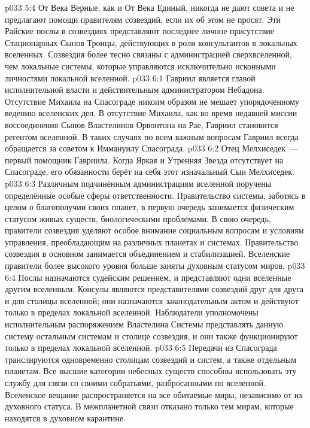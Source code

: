 \vs p033 5:4 От Века Верные, как и От Века Единый, никогда не дают совета и не предлагают помощи правителям созвездий, если их об этом не просят. Эти Райские послы в созвездиях представляют последнее личное присутствие Стационарных Сынов Троицы, действующих в роли консультантов в локальных вселенных. Созвездия более тесно связаны с администрацией сверхвселенной, чем локальные системы, которые управляются исключительно исконными личностями локальной вселенной.
\vs p033 6:1 Гавриил является главой исполнительной власти и действительным администратором Небадона. Отсутствие Михаила на Спасограде никоим образом не мешает упорядоченному ведению вселенских дел. В отсутствие Михаила, как во время недавней миссии воссоединения Сынов Властелинов Орвонтона на Рае, Гавриил становится регентом вселенной. В таких случаях по всем важным вопросам Гавриил всегда обращается за советом к Иммануилу Спасограда.
\vs p033 6:2 Отец Мелхиседек~--- первый помощник Гавриила. Когда Яркая и Утренняя Звезда отсутствует на Спасограде, его обязанности берёт на себя этот изначальный Сын Мелхиседек.
\vs p033 6:3 \pc Различным подчинённым администрациям вселенной поручены определённые особые сферы ответственности. Правительство системы, заботясь в целом о благополучии своих планет, в первую очередь занимается физическим статусом живых существ, биологическими проблемами. В свою очередь, правители созвездия уделяют особое внимание социальным вопросам и условиям управления, преобладающим на различных планетах и системах. Правительство созвездия в основном занимается объединением и стабилизацией. Вселенские правители более высокого уровня больше заняты духовным статусом миров.
\vs p033 6:4 \pc Послы назначаются судейским решением, и представляют одни вселенные другим вселенным. Консулы являются представителями созвездий друг для друга и для столицы вселенной; они назначаются законодательным актом и действуют только в пределах локальной вселенной. Наблюдатели уполномочены исполнительным распоряжением Властелина Системы представлять данную систему остальным системам и столице созвездия, и они также функционируют только в пределах локальной вселенной.
\vs p033 6:5 \pc Передачи из Спасограда транслируются одновременно столицам созвездий и систем, а также отдельным планетам. Все высшие категории небесных существ способны использовать эту службу для связи со своими собратьями, разбросанными по вселенной. Вселенское вещание распространяется на все обитаемые миры, независимо от их духовного статуса. В межпланетной связи отказано только тем мирам, которые находятся в духовном карантине.
